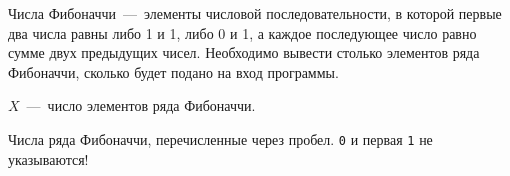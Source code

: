Числа Фибоначчи~---~элементы числовой последовательности, в которой первые два числа равны либо 1 и 1, либо 0 и 1, а каждое последующее число равно сумме двух предыдущих чисел. 
Необходимо вывести столько элементов ряда Фибоначчи, сколько будет подано на вход программы.

\InputFile

$X$~---~число элементов ряда Фибоначчи.

\OutputFile

Числа ряда Фибоначчи, перечисленные через пробел. \texttt{0} и первая \texttt{1} не указываются!

\SAMPLES